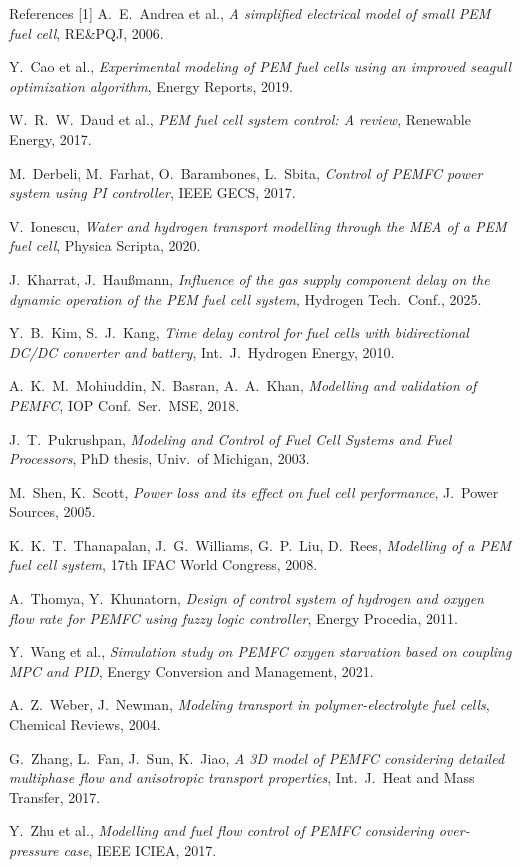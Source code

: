 \documentclass[aspectratio=169,11pt]{beamer}
\begin{document}
\begin{frame}[allowframebreaks]{References}
    \footnotesize
    \setlength{\parskip}{2pt}
    [1] A.~E.~Andrea et al., \emph{A simplified electrical model of small PEM fuel cell}, RE\&PQJ, 2006.\par
    [2] Y.~Cao et al., \emph{Experimental modeling of PEM fuel cells using an improved seagull optimization algorithm}, Energy Reports, 2019.\par
    [3] W.~R.~W.~Daud et al., \emph{PEM fuel cell system control: A review}, Renewable Energy, 2017.\par
    [4] M.~Derbeli, M.~Farhat, O.~Barambones, L.~Sbita, \emph{Control of PEMFC power system using PI controller}, IEEE GECS, 2017.\par
    [5] V.~Ionescu, \emph{Water and hydrogen transport modelling through the MEA of a PEM fuel cell}, Physica Scripta, 2020.\par
    [6] J.~Kharrat, J.~Haußmann, \emph{Influence of the gas supply component delay on the dynamic operation of the PEM fuel cell system}, Hydrogen Tech.\ Conf., 2025.\par
    [7] Y.~B.~Kim, S.~J.~Kang, \emph{Time delay control for fuel cells with bidirectional DC/DC converter and battery}, Int.\ J.\ Hydrogen Energy, 2010.\par
    [8] A.~K.~M.~Mohiuddin, N.~Basran, A.~A.~Khan, \emph{Modelling and validation of PEMFC}, IOP Conf.\ Ser.\ MSE, 2018.\par
    [9] J.~T.~Pukrushpan, \emph{Modeling and Control of Fuel Cell Systems and Fuel Processors}, PhD thesis, Univ.\ of Michigan, 2003.\par
    [10] M.~Shen, K.~Scott, \emph{Power loss and its effect on fuel cell performance}, J.\ Power Sources, 2005.\par
    [11] K.~K.~T.~Thanapalan, J.~G.~Williams, G.~P.~Liu, D.~Rees, \emph{Modelling of a PEM fuel cell system}, 17th IFAC World Congress, 2008.\par
    [12] A.~Thomya, Y.~Khunatorn, \emph{Design of control system of hydrogen and oxygen flow rate for PEMFC using fuzzy logic controller}, Energy Procedia, 2011.\par
    [13] Y.~Wang et al., \emph{Simulation study on PEMFC oxygen starvation based on coupling MPC and PID}, Energy Conversion and Management, 2021.\par
    [14] A.~Z.~Weber, J.~Newman, \emph{Modeling transport in polymer-electrolyte fuel cells}, Chemical Reviews, 2004.\par
    [15] G.~Zhang, L.~Fan, J.~Sun, K.~Jiao, \emph{A 3D model of PEMFC considering detailed multiphase flow and anisotropic transport properties}, Int.\ J.\ Heat and Mass Transfer, 2017.\par
    [16] Y.~Zhu et al., \emph{Modelling and fuel flow control of PEMFC considering over-pressure case}, IEEE ICIEA, 2017.\par
\end{frame}
\end{document}

